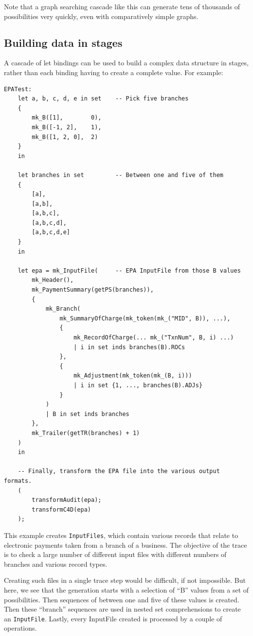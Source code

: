 \documentclass{overturerepchap}
\begin{document}
Note that a graph searching cascade like this can generate tens of thousands of
possibilities very quickly, even with comparatively simple graphs.

\subsection{Building data in stages}

A cascade of let bindings can be used to build a complex data structure in
stages, rather than each binding having to create a complete value. For example:
\scriptsize
\begin{lstlisting}
EPATest:
    let a, b, c, d, e in set    -- Pick five branches
    {
        mk_B([1],        0),
        mk_B([-1, 2],    1),
        mk_B([1, 2, 0],  2)
    }
    in

    let branches in set         -- Between one and five of them
    {
        [a],
        [a,b],
        [a,b,c],
        [a,b,c,d],
        [a,b,c,d,e]
    }
    in
 
    let epa = mk_InputFile(     -- EPA InputFile from those B values
        mk_Header(),
        mk_PaymentSummary(getPS(branches)),
        {
            mk_Branch(
                mk_SummaryOfCharge(mk_token(mk_("MID", B)), ...),
                {
                    mk_RecordOfCharge(... mk_("TxnNum", B, i) ...)
                    | i in set inds branches(B).ROCs
                },
                {
                    mk_Adjustment(mk_token(mk_(B, i)))
                    | i in set {1, ..., branches(B).ADJs}
                }
            )
            | B in set inds branches
        },
        mk_Trailer(getTR(branches) + 1)
    )
    in

    -- Finally, transform the EPA file into the various output formats.
    (
        transformAudit(epa);
        transformC4D(epa)
    );
\end{lstlisting}
\normalsize
This example creates \texttt{InputFiles}, which contain various records that
relate to electronic payments taken from a branch of a business. The objective of the
trace is to check a large number of different input files with different numbers
of branches and various record types.

Creating such files in a single trace step would be difficult, if not
impossible. But here, we see that the generation starts with a selection of
``B'' values from a set of possibilities. Then sequences of between one and five
of these values is created. Then these ``branch'' sequences are used in nested
set comprehensions to create an \texttt{InputFile}. Lastly, every InputFile
created is processed by a couple of operations.
\end{document}

